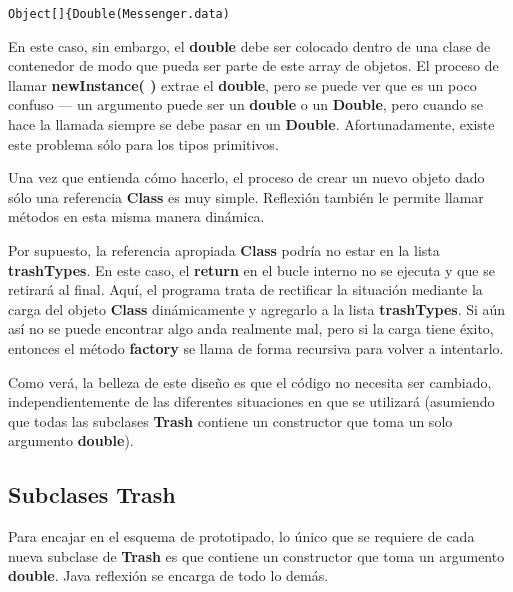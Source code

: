 \begin{lstlisting} 
Object[]{Double(Messenger.data)
\end{lstlisting}

En este caso, sin embargo, el \textbf{double} debe ser colocado dentro de una clase de contenedor de modo que pueda ser parte de este array de objetos. El proceso de llamar \textbf{newInstance( )} extrae el \textbf{double}, pero se puede ver que es un poco confuso — un argumento puede ser un \textbf{double} o un \textbf{Double}, pero cuando se hace la llamada siempre se debe pasar en un \textbf{Double}. Afortunadamente, existe este problema sólo para los tipos primitivos.   \newline

Una vez que entienda cómo hacerlo, el proceso de crear un nuevo objeto dado sólo una referencia \textbf{Class} es muy simple. Reflexión también le permite llamar métodos en esta misma manera dinámica.      \newline

Por supuesto, la referencia apropiada \textbf{Class} podría no estar en la lista \textbf{trashTypes}. En este caso, el \textbf{return} en el bucle interno no se ejecuta y que se retirará al final. Aquí, el programa trata de rectificar la situación mediante la carga del objeto \textbf{Class} dinámicamente y agregarlo a la lista \textbf{trashTypes}. Si aún así no se puede encontrar algo anda realmente mal, pero si la carga tiene éxito, entonces el método  \textbf{factory} se llama de forma recursiva para volver a intentarlo.    \newline

Como verá, la belleza de este diseño es que el código no necesita ser cambiado, independientemente de las diferentes situaciones en que se utilizará (asumiendo que todas las subclases \textbf{Trash} contiene un constructor que toma un solo argumento \textbf{double}).     \newline

\subsection*{Subclases \textbf{Trash}}
\label{subsec:st}



Para encajar en el esquema de prototipado, lo único que se requiere de cada nueva subclase de \textbf{Trash} es que contiene un constructor que toma un argumento \textbf{double}. Java reflexión se encarga de todo lo demás.    \newline

